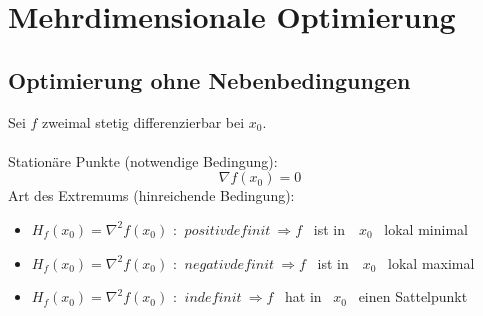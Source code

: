 \section{Mehrdimensionale Optimierung} %
\label{sec:mehrdimensionale_optimierung}

\subsection{Optimierung ohne Nebenbedingungen} %
\label{sub:optimierung_ohne_nebenbedingungen}
Sei $f$ zweimal stetig differenzierbar bei $x_0$.
\\\\Stationäre Punkte (notwendige Bedingung):
\begin{equation}
	\nabla f (x_0) = 0
\end{equation}
Art des Extremums (hinreichende Bedingung):

\begin{itemize}
	\item $H_f(x_0) = \nabla^2f(x_0)$ : $\ positiv definit \  \Rightarrow f $ \ ist in \ $ x_0 $ \ lokal minimal
	\item $H_f(x_0) = \nabla^2f(x_0)$ : $\ negativ definit \  \Rightarrow f $ \ ist in \ $ x_0 $ \ lokal maximal
	\item $H_f(x_0) = \nabla^2f(x_0)$ : $\ indefinit \ \Rightarrow f $ \ hat in \ $ x_0 $ \ einen Sattelpunkt
\end{itemize}
